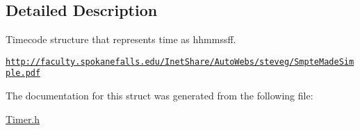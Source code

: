 \subsection{Detailed Description}
Timecode structure that represents time as hhmmssff. 

\href{http://faculty.spokanefalls.edu/InetShare/AutoWebs/steveg/SmpteMadeSimple.pdf}{\tt http\+://faculty.\+spokanefalls.\+edu/\+Inet\+Share/\+Auto\+Webs/steveg/\+Smpte\+Made\+Simple.\+pdf} 

The documentation for this struct was generated from the following file\+:\begin{DoxyCompactItemize}
\item 
\hyperlink{Timer_8h}{Timer.\+h}\end{DoxyCompactItemize}
